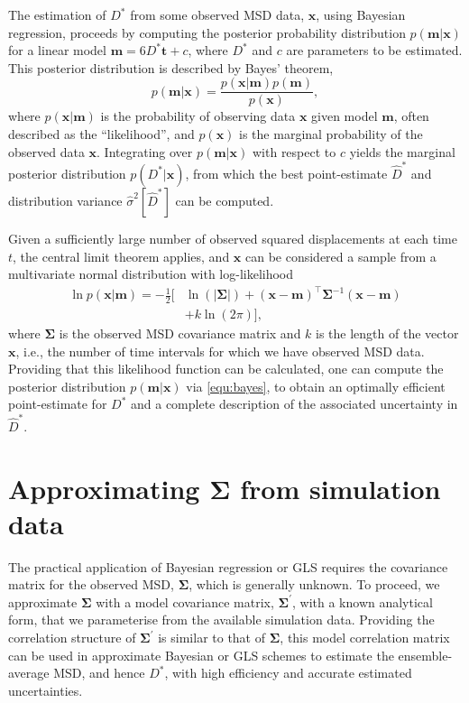 \documentclass[reprint,superscriptaddress,nobibnotes,amsmath,amssymb,aps,prx,hidelinks]{revtex4-2}
\newcommand{\oMSD}{\ensuremath{\bm{x}}}
\newcommand{\model}{\bm{m}}
\newcommand{\prob}[1]{\ensuremath{p(#1)}}
\newcommand{\Dest}{\ensuremath{\widehat{D}^*}}
\newcommand{\D}{\ensuremath{D^*}}
\newcommand{\varest}[1]{\ensuremath{\widehat{\sigma}^2[#1]}}
\begin{document}
The estimation of $\D$ from some observed MSD data, $\oMSD$, using Bayesian regression, proceeds by computing the posterior probability distribution $\prob{\model|\oMSD}$ for a linear model $\model = 6\D \bm{t} + c$, where $\D$ and $c$ are parameters to be estimated.
This posterior distribution is described by Bayes' theorem,
\begin{equation}
    \prob{\model|\oMSD} = \frac{\prob{{\oMSD|\model}}\prob{\model}}{\prob{\oMSD}},
    \label{equ:bayes}
\end{equation}
where $\prob{\oMSD|\model}$ is the probability of observing data $\oMSD$ given model $\model$, often described as the ``likelihood'', and $\prob{\oMSD}$ is the marginal probability of the observed data $\oMSD$.
Integrating over $\prob{\model|\oMSD}$ with respect to $c$ yields the marginal posterior distribution $\prob{\D|\oMSD}$, from which the best point-estimate $\Dest$ and distribution variance $\varest{\Dest}$ can be computed.

Given a sufficiently large number of observed squared displacements at each time $t$, the central limit theorem applies, and $\oMSD$ can be considered a sample from a multivariate normal distribution with log-likelihood
\begin{equation}
    \begin{aligned}{}
      \ln \prob{\oMSD|\model} = -\frac{1}{2}\big[ & \ln(\left|\mathbf{\Sigma}\right|) + {(\oMSD - \model)}^{\!\top}\mathbf{\Sigma}^{-1}(\oMSD - \model) \\ 
      & + k \ln(2\pi)\big],
    \end{aligned}
    \label{equ:loglike}
\end{equation}
where $\mathbf{\Sigma}$ is the observed MSD covariance matrix and $k$ is the length of the vector $\oMSD$, i.e., the number of time intervals for which we have observed MSD data.
Providing that this likelihood function can be calculated, one can compute the posterior distribution $\prob{\model | \oMSD}$ via \cref{equ:bayes}, to obtain an optimally efficient point-estimate for $\D$ and a complete description of the associated uncertainty in $\Dest$.

\section{Approximating $\bm{\Sigma}$ from simulation data}

The practical application of Bayesian regression or GLS requires the covariance matrix for the observed MSD, $\mathbf{\Sigma}$, which is generally unknown.
To proceed, we approximate $\mathbf{\Sigma}$ with a model covariance matrix, $\mathbf{\Sigma^\prime}$, with a known analytical form, that we parameterise from the available simulation data.
Providing the correlation structure of $\mathbf{\Sigma^\prime}$ is similar to that of $\mathbf{\Sigma}$, this model correlation matrix can be used in approximate Bayesian or GLS schemes to estimate the ensemble-average MSD, and hence $\D$, with high efficiency and accurate estimated uncertainties.
\end{document}
